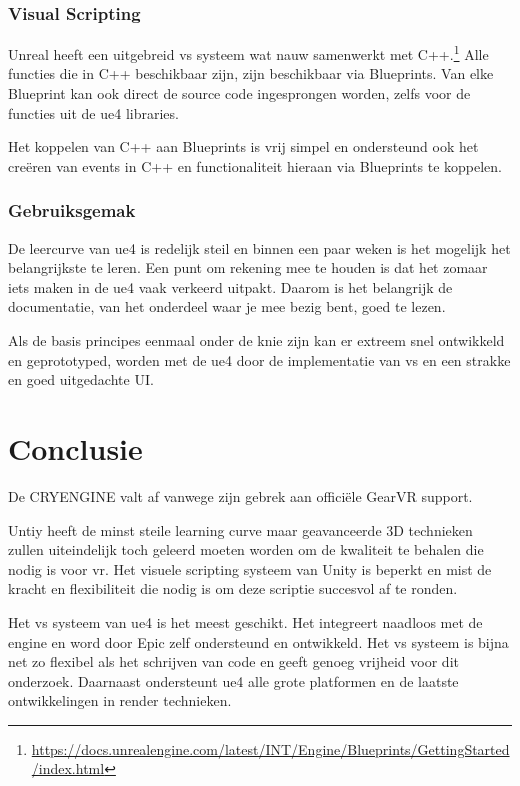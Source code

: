 \subsubsection{Visual Scripting}
Unreal heeft een uitgebreid \gls{vs} systeem wat nauw samenwerkt met C++.\footnote{\url{https://docs.unrealengine.com/latest/INT/Engine/Blueprints/GettingStarted/index.html}} Alle functies die in C++ beschikbaar zijn, zijn beschikbaar via Blueprints. Van elke Blueprint kan ook direct de source code ingesprongen worden, zelfs voor de functies uit de \gls{ue4} libraries.

Het koppelen van C++ aan Blueprints is vrij simpel en ondersteund ook het creëren van events in C++ en functionaliteit hieraan via Blueprints te koppelen.

\subsubsection{Gebruiksgemak}
De leercurve van \gls{ue4} is redelijk steil en binnen een paar weken is het mogelijk het belangrijkste te leren. Een punt om rekening mee te houden is dat het zomaar iets maken in de \gls{ue4} vaak verkeerd uitpakt. Daarom is het belangrijk de documentatie, van het onderdeel waar je mee bezig bent, goed te lezen.

Als de basis principes eenmaal onder de knie zijn kan er extreem snel ontwikkeld en geprototyped, worden met de \gls{ue4} door de implementatie van \gls{vs} en een strakke en goed uitgedachte UI.

\section{Conclusie}
De CRYENGINE valt af vanwege zijn gebrek aan officiële GearVR support. 

Untiy heeft de minst steile learning curve maar geavanceerde 3D technieken zullen uiteindelijk toch geleerd moeten worden om de kwaliteit te behalen die nodig is voor \gls{vr}. Het visuele scripting systeem van Unity is beperkt en mist de kracht en flexibiliteit die nodig is om deze scriptie succesvol af te ronden.

Het \gls{vs} systeem van \gls{ue4} is het meest geschikt. Het integreert naadloos met de engine en word door Epic zelf ondersteund en ontwikkeld. Het \gls{vs} systeem is bijna net zo flexibel als het schrijven van code en geeft genoeg vrijheid voor dit onderzoek. Daarnaast ondersteunt \gls{ue4} alle grote platformen en de laatste ontwikkelingen in render technieken.
